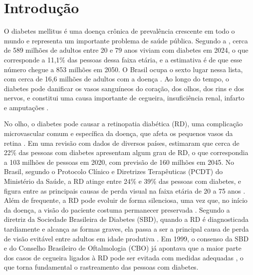 \chapter{Introdução}
\label{cap:introducao}

O diabetes mellitus é uma doença crônica de prevalência crescente em todo o mundo e representa um importante problema de saúde pública. Segundo a , cerca de 589 milhões de adultos entre 20 e 79 anos viviam com diabetes em 2024, o que corresponde a 11,1\% das pessoas dessa faixa etária, e a estimativa é de que esse número chegue a 853 milhões em 2050. O Brasil ocupa o sexto lugar nessa lista, com cerca de 16,6 milhões de adultos com a doença \cite[p.~47]{idfAtlas2025}. Ao longo do tempo, o diabetes pode danificar os vasos sanguíneos do coração, dos olhos, dos rins e dos nervos, e constitui uma causa importante de cegueira, insuficiência renal, infarto e amputações \cite{who2026diabetes}.

No olho, o diabetes pode causar a retinopatia diabética (RD), uma complicação microvascular comum e específica da doença, que afeta os pequenos vasos da retina \cite{brasil2021pcdtrd,malerbi2026rd}. Em uma revisão com dados de diversos países,  estimaram que cerca de 22\% das pessoas com diabetes apresentam algum grau de RD, o que correspondia a 103 milhões de pessoas em 2020, com previsão de 160 milhões em 2045. No Brasil, segundo o Protocolo Clínico e Diretrizes Terapêuticas (PCDT) do Ministério da Saúde, a RD atinge entre 24\% e 39\% das pessoas com diabetes, e figura entre as principais causas de perda visual na faixa etária de 20 a 75 anos \cite{brasil2021pcdtrd}. Além de frequente, a RD pode evoluir de forma silenciosa, uma vez que, no início da doença, a visão do paciente costuma permanecer preservada \cite{brasil2021pcdtrd}. Segundo a diretriz da Sociedade Brasileira de Diabetes (SBD), quando a RD é diagnosticada tardiamente e alcança as formas graves, ela passa a ser a principal causa de perda de visão evitável entre adultos em idade produtiva \cite{malerbi2026rd}. Em 1999, o consenso da SBD e do Conselho Brasileiro de Oftalmologia (CBO) já apontava que a maior parte dos casos de cegueira ligados à RD pode ser evitada com medidas adequadas \cite{gross1999consenso}, o que torna fundamental o rastreamento das pessoas com diabetes.


